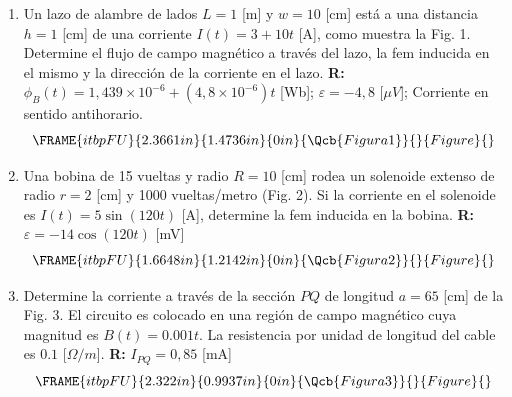 \documentclass[12pt]{article}
\begin{document}
\begin{enumerate}
\item Un lazo de alambre de lados $L=1$ [m] y $w=10$ [cm] est\'{a} a una
distancia $h=1$ [cm] de una corriente $I(t)=3+10t$ [A], como muestra la Fig.
1. Determine el flujo de campo magn\'{e}tico a trav\'{e}s del lazo, la fem
inducida en el mismo y la direcci\'{o}n de la corriente en el lazo. \textbf{%
R: }$\phi _{B}(t)=1,439\times 10^{-6}+\left( 4,8\times 10^{-6}\right) t$
[Wb]; $\varepsilon =-4,8$ [$\mu V$]; Corriente en sentido antihorario.%
\begin{equation*}
\FRAME{itbpFU}{2.3661in}{1.4736in}{0in}{\Qcb{Figura 1}}{}{Figure}{\special%
{language "Scientific Word";type "GRAPHIC";maintain-aspect-ratio
TRUE;display "USEDEF";valid_file "T";width 2.3661in;height 1.4736in;depth
0in;original-width 3.8735in;original-height 2.4025in;cropleft "0";croptop
"1";cropright "1";cropbottom "0";tempfilename
'R45S6501.wmf';tempfile-properties "XPR";}}
\end{equation*}

\item Una bobina de 15 vueltas y radio $R=10$ [cm] rodea un solenoide
extenso de radio $r=2$ [cm] y 1000 vueltas/metro (Fig. 2). Si la corriente
en el solenoide es $I(t)=5\sin (120t)$ [A], determine la fem inducida en la
bobina. \textbf{R: }$\varepsilon =-14\cos (120t)$ [mV] 
\begin{equation*}
\FRAME{itbpFU}{1.6648in}{1.2142in}{0in}{\Qcb{Figura 2}}{}{Figure}{\special%
{language "Scientific Word";type "GRAPHIC";maintain-aspect-ratio
TRUE;display "USEDEF";valid_file "T";width 1.6648in;height 1.2142in;depth
0in;original-width 3.7619in;original-height 2.7363in;cropleft "0";croptop
"1";cropright "1";cropbottom "0";tempfilename
'R45S6502.wmf';tempfile-properties "XPR";}}
\end{equation*}

\item Determine la corriente a trav\'{e}s de la secci\'{o}n $PQ$ de longitud 
$a=65$ [cm] de la Fig. 3. El circuito es colocado en una regi\'{o}n de campo
magn\'{e}tico cuya magnitud es $B(t)=0.001t.$ La resistencia por unidad de
longitud del cable es $0.1$ [$\Omega /m$]. \textbf{R:} $I_{PQ}=0,85$ [mA]%
\begin{equation*}
\FRAME{itbpFU}{2.322in}{0.9937in}{0in}{\Qcb{Figura 3}}{}{Figure}{\special%
{language "Scientific Word";type "GRAPHIC";maintain-aspect-ratio
TRUE;display "USEDEF";valid_file "T";width 2.322in;height 0.9937in;depth
0in;original-width 4.8724in;original-height 2.0695in;cropleft "0";croptop
"1";cropright "1";cropbottom "0";tempfilename
'R45S6503.wmf';tempfile-properties "XPR";}}
\end{equation*}


\end{enumerate}
\end{document}
